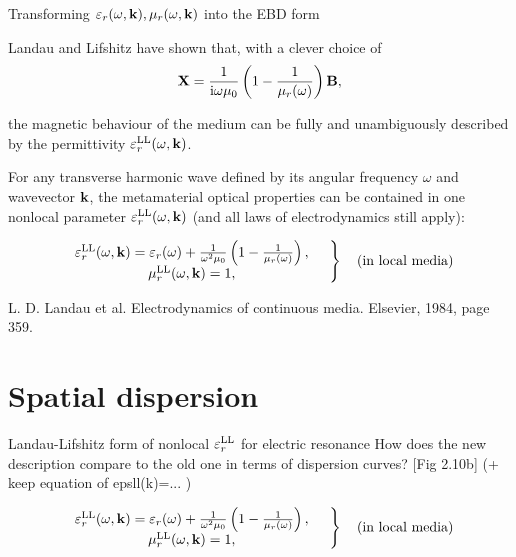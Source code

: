 \documentclass[t]{beamer} \usepackage[english]{babel} \usepackage[utf8]{inputenc} \usetheme{Frankfurt} %
\begin{document}
\begin{frame}[plain]{\tiny{\vspace{-1em}Transforming $\varepsilon_r(\omega,{\mathbf{k}}), \mu_r(\omega,{\mathbf{k}})$ into the EBD form\vspace{-.5em}}}%

Landau and Lifshitz have shown that, with a clever choice of 
\begin{equation*} \mathbf{X} = \frac{1}{{\mathrm i}\omega\mu_0}\left(1 - \frac{1}{\mu_r(\omega)}\right)\mathbf{B}, \label{eq_Xsd}\end{equation*}

the magnetic behaviour of the medium can be fully and unambiguously described by the permittivity $\varepsilon_r^\text{LL}(\omega,{\mathbf{k}})$.
\vfill

For any transverse harmonic wave defined by its angular frequency $\omega$ and wavevector ${\mathbf{k}}$, the metamaterial optical properties can be contained in one nonlocal parameter $\varepsilon_r^\text{LL}(\omega,{\mathbf{k}})$ (and all laws of electrodynamics still apply):
	\begin{exampleblock}
		\;\vspace{-1em}
	\begin{equation*}
 \left.  \begin{array}{c}
\varepsilon_r^\text{LL}(\omega,{\mathbf{k}}) = \varepsilon_r(\omega)+\frac{1}{\omega^2 \mu_0}\left(1 - \frac{1}{\mu_r(\omega)}\right), \\
\mu_r^\text{LL}(\omega,{\mathbf{k}}) = 1, 
\end{array} \quad \right\} \quad \text{(in local media)} 
	\end{equation*}
	\end{exampleblock}

\begin{scriptsize}L. D. Landau et al. Electrodynamics of continuous media. Elsevier, 1984, page 359. \end{scriptsize}
\end{frame} %

\section{Spatial dispersion}
\begin{frame}{Landau-Lifshitz form of nonlocal $\varepsilon_r^\text{LL}$ for electric resonance}%
How does the new description compare to the old one in terms of dispersion curves?  [Fig 2.10b] (+ keep equation of epsll(k)=... )

\vfill
	\begin{exampleblock}
		\;\vspace{-1em}
	\begin{equation*}
 \left.  \begin{array}{c}
\varepsilon_r^\text{LL}(\omega,{\mathbf{k}}) = \varepsilon_r(\omega)+\frac{1}{\omega^2 \mu_0}\left(1 - \frac{1}{\mu_r(\omega)}\right), \\
\mu_r^\text{LL}(\omega,{\mathbf{k}}) = 1, 
\end{array} \quad \right\} \quad \text{(in local media)} 
	\end{equation*}
	\end{exampleblock}
\end{frame} %
\end{document}
